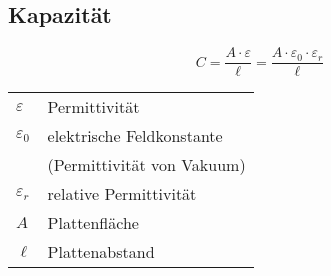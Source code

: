



\subsection{Kapazität}
\[ C = \frac{A \cdot \varepsilon}{\ell} 
= \frac{A \cdot \varepsilon_0 \cdot \varepsilon_r}{\ell} \]
\begin{tabular}{lp{}}
$\varepsilon$&Permittivität\\
$\varepsilon_0$&elektrische Feldkonstante\\
&(Permittivität von Vakuum)\\
$\varepsilon_r$&relative Permittivität\\
$A$&Plattenfläche\\
$\ell$&Plattenabstand
\end{tabular}